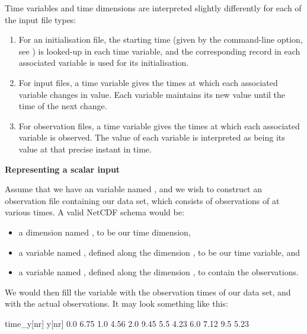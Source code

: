 Time variables and time dimensions are interpreted slightly differently for
each of the input file types:
\begin{enumerate}
\item For an initialisation file, the starting time (given by the
   command-line option, see ) is
  looked-up in each time variable, and the corresponding record in each
  associated variable is used for its initialisation.
\item For input files, a time variable gives the times at which each
  associated variable changes in value. Each variable maintains its new
  value until the time of the next change.
\item For observation files, a time variable gives the times at which each
  associated variable is observed. The value of each variable is interpreted
  as being its value at that precise instant in time.
\end{enumerate}

\begin{example}
\noindent \textbf{Representing a scalar input}

Assume that we have an  variable named , and we wish to
construct an observation file containing our data set, which consists of
observations of  at various times. A valid NetCDF schema would be:
\begin{itemize}
\item a dimension named , to be our time dimension,
\item a variable named , defined along the dimension ,
  to be our time variable, and
\item a variable named , defined along the dimension , to
  contain the observations.
\end{itemize}
We would then fill the variable  with the observation times of
our data set, and  with the actual observations. It may look something
like this:

\begin{cmdcode}
time_y[nr]    y[nr]
       0.0     6.75
       1.0     4.56
       2.0     9.45
       5.5     4.23
       6.0     7.12
       9.5     5.23
\end{cmdcode}

\end{example}

